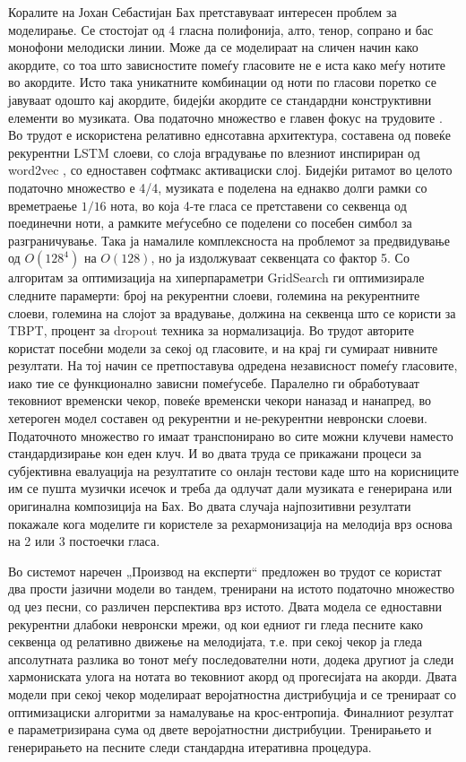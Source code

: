 Коралите на Јохан Себастијан Бах претставуваат интересен проблем за моделирање. Се стостојат од 4 гласна полифонија, алто, тенор, сопрано и бас монофони мелодиски линии. Може да се моделираат на сличен начин како акордите, со тоа што зависностите помеѓу гласовите не е иста како меѓу нотите во акордите. Исто така уникатните комбинации од ноти по гласови поретко се јавуваат одошто кај акордите, бидејќи акордите се стандардни конструктивни елементи во музиката. Ова податочно множество е главен фокус на трудовите \cite{Liang2017, Hadjeres2016}. Во трудот \cite{Liang2017} е искористена релативно еднсотавна архитектура, составена од повеќе рекурентни LSTM слоеви, со слоја вградување по влезниот инспириран од word2vec \cite{Herremans2017}, со едноставен софтмакс активациски слој. Бидејќи ритамот во целото податочно множество е 4/4, музиката е поделена на еднакво долги рамки со времетраење $1/16$ нота, во која 4-те гласа се претставени со секвенца од поединечни ноти, а рамките меѓусебно се поделени со посебен симбол за разграничување. Така ја намалиле комплексноста на проблемот за предвидување од $O(128^4)$ на $O(128)$, но ја издолжуваат секвенцата со фактор 5. Со алгоритам за оптимизација на хиперпараметри GridSearch ги оптимизирале следните парамерти: број на рекурентни слоеви, големина на рекурентните слоеви, големина на слојот за врадување, должина на секвенца што се користи за TBPT, процент за dropout техника за нормализација. Во трудот \cite{Hadjeres2016} авторите користат посебни модели за секој од гласовите, и на крај ги сумираат нивните резултати. На тој начин се претпоставува одредена независност помеѓу гласовите, иако тие се функционално зависни помеѓусебе. Паралелно ги обработуваат тековниот временски чекор, повеќе временски чекори наназад и нанапред, во хетероген модел составен од рекурентни и не-рекурентни невронски слоеви. Податочното множество го имаат транспонирано во сите можни клучеви наместо стандардизирање кон еден клуч. И во двата труда се прикажани процеси за субјективна евалуација на резултатите со онлајн тестови каде што на корисниците им се пушта музички исечок и треба да одлучат дали музиката е генерирана или оригинална композиција на Бах. Во двата случаја најпозитивни резултати покажале кога моделите ги користеле за рехармонизација на мелодија врз основа на 2 или 3 постоечки гласа.

Во системот наречен „Производ на експерти“ предложен во трудот \cite{Johnson2017} се користат два прости јазични модели во тандем, тренирани на истото податочно множество од џез песни, со различен перспектива врз истото. Двата модела се едноставни рекурентни длабоки невронски мрежи, од кои едниот ги гледа песните како секвенца од релативно движење на мелодијата, т.е. при секој чекор ја гледа апсолутната разлика во тонот меѓу последователни ноти, додека другиот ја следи хармониската улога на нотата во тековниот акорд од прогесијата на акорди. Двата модели при секој чекор моделираат веројатностна дистрибуција и се тренираат со оптимизациски алгоритми за намалување на крос-ентропија. Финалниот резултат е параметризирана сума од двете веројатностни дистрибуции. Тренирањето и генерирањето на песните следи стандардна итеративна процедура.

